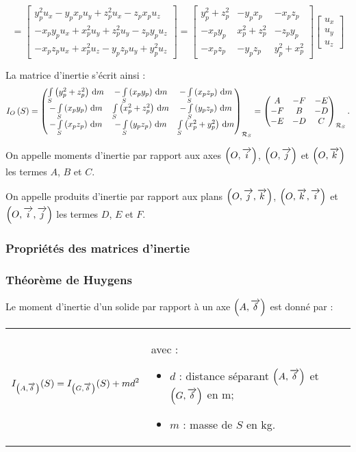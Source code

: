 \documentclass[10pt,fleqn]{article} %
\begin{document}
$$
=
\begin{bmatrix}
  y_p^2 u_x  - y_p x_p u_y   +  z_p^2 u_x  -z_p x_p u_z  \\
   -x_p  y_p u_x+x_p^2 u_y  + z_p^2 u_y  - z_p y_p u_z  \\
   -x_p  z_p u_x+ x_p^2 u_z   -y_p  z_pu_y +y_p^2  u_z
\end{bmatrix}
=
\begin{bmatrix}
 y_p^2 +  z_p^2 &  - y_p x_p &      -x_p  z_p   \\
 -x_p  y_p  & x_p^2   + z_p^2   & - z_p y_p   \\
  -x_p  z_p &    -y_p  z_p  & y_p^2  + x_p^2 
\end{bmatrix}
\begin{bmatrix}
u_x \\ u_y \\ u_z
\end{bmatrix}
$$


\begin{defi}
La matrice d'inertie s'écrit ainsi : 
$$
\inertie{O}{S}=\matinertie{\int\limits_{S} \left(y_p^2 + z_p^2 \right)\,\dd m}{\int\limits_{S} \left(x_p^2 + z_p^2 \right)\,\dd m}{\int\limits_{S} \left(x_p^2 + y_p^2 \right)\,\dd m}{-\int\limits_{S} \left(y_pz_p\right)\,\dd m}{-\int\limits_{S} \left(x_pz_p\right)\,\dd m}{-\int\limits_{S} \left(x_py_p\right)\,\dd m}{\mathcal{R}_S}=\matinertie{A}{B}{C}{-D}{-E}{-F}{\mathcal{R}_S}
.$$

On appelle moments d'inertie par rapport aux axes $\axe{O}{{i}}$, $\axe{O}{{j}}$ et $\axe{O}{{k}}$  les termes $A$, $B$ et $C$. 

On appelle produits d'inertie par rapport aux plans $\left(O, \vect{j}, \vect{k}\right)$, $\left(O, \vect{k}, \vect{i}\right)$ et $\left(O, \vect{i}, \vect{j}\right)$ 
les termes $D$, $E$ et $F$.
\end{defi}

\subsubsection{Propriétés des matrices d'inertie}
\subsubsection{Théorème de Huygens}
\begin{theorem}
Le moment d'inertie d'un solide par rapport à un axe  $\axe{A}{\delta}$ est donné par :

\begin{tabular}{m{.45\linewidth}m{.45\linewidth}}
$$I_{\axe{A}{\delta}}(S)=I_{\axe{G}{\delta}}(S)+md^2 $$ & 
avec :
\begin{itemize}
\item $d$ : distance séparant $\axe{A}{\delta}$ et $\axe{G}{\delta}$ en m;
\item $m$ : masse de $S$ en kg.
\end{itemize}
\end{tabular}
\end{theorem}
\end{document}
